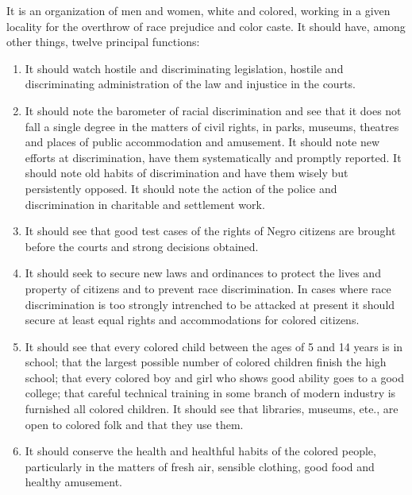 \documentclass[letterpaper,10pt,english]{jupyterBook}
\begin{document}
\sphinxAtStartPar
It is an organization of men and women, white and colored, working in a given locality for the overthrow of race prejudice and color caste. It should have, among other things, twelve principal functions:
\begin{enumerate}
%
\item {} 
\sphinxAtStartPar
{} It should watch hostile and discriminating legislation, hostile and discriminating administration of the law and injustice in the courts.

\item {} 
\sphinxAtStartPar
{} It should note the barometer of racial discrimination and see that it does not fall a single degree in the matters of civil rights, in parks, museums, theatres and places of public accommodation and amusement. It should note new efforts at discrimination, have them systematically and promptly reported. It should note old habits of discrimination and have them wisely but persistently opposed. It should note the action of the police and discrimination in charitable and settlement work.

\item {} 
\sphinxAtStartPar
{} It should see that good test cases of the rights of Negro citizens are brought before the courts and strong decisions obtained.

\item {} 
\sphinxAtStartPar
{} It should seek to secure new laws and ordinances to protect the lives and property of citizens and to prevent race discrimination. In cases where race discrimination is too strongly intrenched to be attacked at present it should secure at least equal rights and accommodations for colored citizens.

\item {} 
\sphinxAtStartPar
{} It should see that every colored child between the ages of 5 and 14 years is in school; that the largest possible number of colored children finish the high school; that every colored boy and girl who shows good ability goes to a good college; that careful technical training in some branch of modern industry is furnished all colored children.
It should see that libraries, museums, ete., are open to colored folk and that they use them.

\item {} 
\sphinxAtStartPar
{} It should conserve the health and healthful habits of the colored people, particularly in the matters of fresh air, sensible clothing, good food and healthy amusement.


\end{enumerate}
\end{document}
